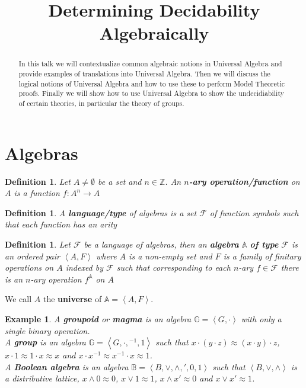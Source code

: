 \documentclass[12pt,a4paper]{article}
\title{Determining Decidability Algebraically}
\date{}
\newtheorem{example}[theorem]{Example}
\newtheorem{definition}[theorem]{Definition}
\begin{document}
	

	
\maketitle

\begin{abstract}
In this talk we will contextualize common algebraic notions in Universal Algebra and provide examples of translations into Universal Algebra.
Then we will discuss the logical notions of Universal Algebra and how to use these to perform Model Theoretic proofs.
Finally we will show how to use Universal Algebra to show the undecidiability of certain theories, in particular the theory of groups.
\end{abstract}
\section{Algebras}

\begin{definition}
Let $A\neq\emptyset$ be a set and $n\in\mathbb{Z}$. An \textbf{$n$-ary operation/function} on $A$ is a function $f:A^n\to A$
\end{definition}

\begin{definition}
A \textbf{language/type} of algebras is a set $\mathcal{F}$ of function symbols such that each function has an arity
\end{definition}

\begin{definition}
Let $\mathcal{F}$ be a language of algebras, then an \textbf{algebra} $\mathbb{A}$ \textbf{of type } $\mathcal{F}$ is an ordered pair $\left<A,F\right>$ where $A$ is a non-empty set and $F$ is a family of finitary operations on $A$ indexed by $\mathcal{F}$ such that corresponding to each $n$-ary $f\in\mathcal{F}$ there is an $n$-ary operation $f^\mathbb{A}$ on $A$
\end{definition}

We call $A$ the \textbf{universe} of $\mathbb{A}=\left<A,F\right>$.

\begin{example}
A \textbf{groupoid} or \textbf{magma} is an algebra $\mathbb{G}=\left<G,\cdot\right>$ with only a single binary operation.\\
A \textbf{group} is an algebra $\mathbb{G}=\left<G,\cdot,{}^{-1},1\right>$ such that $x\cdot(y\cdot z)\approx (x\cdot y)\cdot z$, $x\cdot 1\approx 1\cdot x\approx x$ and $x\cdot x^{-1}\approx x^{-1}\cdot x\approx 1$.\\
A \textbf{Boolean algebra} is an algebra $\mathbb{B}=\left<B,\vee,\wedge,',0,1\right>$ such that $\left<B,\vee,\wedge\right>$ is a distributive lattice, $x\wedge 0\approx 0$, $x\vee 1\approx 1$, $x\wedge x'\approx 0$ and $x\vee x'\approx 1$.\\
\end{example}
\end{document}
